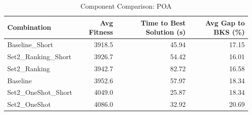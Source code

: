 \documentclass{article}
\begin{document}
\begin{table}[htbp]
\centering
\caption{Component Comparison: POA}
\label{tab:comparison_poa}
\begin{tabular}{lrrr}
\toprule
Combination & Avg Fitness & Time to Best Solution (s) & Avg Gap to BKS (\%) \\
\midrule
Baseline\_Short & 3918.5 & 45.94 & 17.15 \\
Set2\_Ranking\_Short & 3926.7 & 54.42 & 16.01 \\
Set2\_Ranking & 3942.7 & 82.72 & 16.58 \\
Baseline & 3952.6 & 57.97 & 18.34 \\
Set2\_OneShot\_Short & 4049.0 & 25.87 & 18.34 \\
Set2\_OneShot & 4086.0 & 32.92 & 20.69 \\
\bottomrule
\end{tabular}
\end{table}
\end{document}
